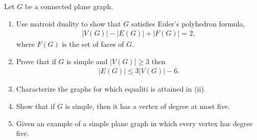 \prob
{
    Let $G$ be a connected plane graph.
    \begin{enumerate}[label=(\roman*)]
        \item Use matroid duality to show that $G$ satisfies Euler's polyhedron formula,
                \begin{align}
                        |V(G)| - |E(G)| + |F(G)| = 2,
                \end{align}
                where $F(G)$ is the set of faces of $G$.
        \item Prove that if $G$ is simple and $|V(G)| \geq 3$ then
                \begin{align}
                    |E(G)| \leq 3|V(G)| - 6.
                \end{align}
                
        \item Characterize the graphs for which equaliti is attained in (ii).
        
        \item Show that if $G$ is simple, then it has a vertex of degree at most five.
        
        \item Given an example of a simple plane graph in which every vertex has degree five.
    \end{enumerate}
}